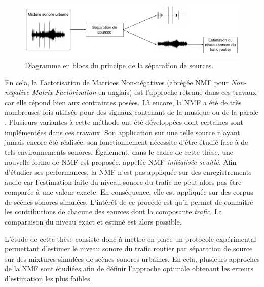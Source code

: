 \begin{figure}[h]
\centering
\includegraphics[width=\linewidth]{./figures/autres/schema_source_separation_FR.pdf}
\caption{Diagramme en blocs du principe de la séparation de sources.}
\label{fig:separation_source_intro}
\end{figure}


En cela, la Factorisation de Matrices Non-négatives (abrégée NMF pour \textit{Non-negative Matrix Factorization} en anglais) \cite{lee_learning_1999} est l'approche retenue dans ces travaux car elle répond bien aux contraintes posées. Là encore, la NMF a été de très nombreuses fois utilisée pour des signaux contenant de la musique \cite{helen2005separation,fevotte_nonnegative_2009} ou de la parole \cite{wilson2008speech,schmidt2006single}. Plusieurs variantes à cette méthode ont été développées dont certaines sont implémentées dans ces travaux. Son application sur une telle source n'ayant jamais encore été réalisée, son fonctionnement nécessite d'être étudié face à de tels environnements sonores. Également, dans le cadre de cette thèse, une nouvelle forme de NMF est proposée, appelée NMF \textit{initialisée seuillé}. 
Afin d'étudier ses performances, la NMF n'est pas appliquée sur des enregistrements audio car l'estimation faite du niveau sonore du trafic ne peut alors pas être comparée à une valeur exacte. En conséquence, elle est appliquée sur des corpus de scènes sonores simulées. L'intérêt de ce procédé est qu'il permet de connaitre les contributions de chacune des sources dont la composante \textit{trafic}. La comparaison du niveau exact et estimé est alors possible.

L'étude de cette thèse consiste donc à mettre en place un protocole expérimental permettant d'estimer le niveau sonore du trafic routier par séparation de source sur des mixtures simulées de scènes sonores urbaines. En cela, plusieurs approches de la NMF sont étudiées afin de définir l'approche optimale obtenant les erreurs d'estimation les plus faibles.



